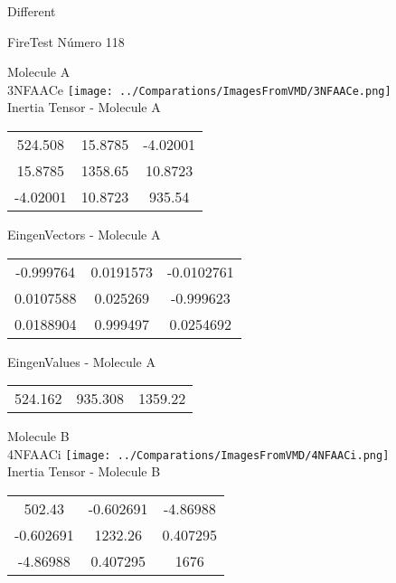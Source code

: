\begin{center}
\vtab
\vtab
\textcolor{NavyBlue}{\Large Different}
\end{center}

 \newpage

\vtab[-2cm]
\begin{center}
{\large FireTest \tab Número 118}
\end{center}
\begin{multicols}{2}
\begin{center}

Molecule A \\ 
3NFAACe
\texttt{[image: ../Comparations/ImagesFromVMD/3NFAACe.png]}
\\
Inertia Tensor - Molecule A \\
\vtab

\begin{tabular}{|c c c|}
524.508	 & 	15.8785	 & 	-4.02001	 \\
15.8785	 & 	1358.65	 & 	10.8723	 \\
-4.02001	 & 	10.8723	 & 	935.54
\end{tabular}

\vtab
 EingenVectors - Molecule A     \\
\vtab
\begin{tabular}{|c c c|}
-0.999764	 & 	0.0191573	 & 	-0.0102761	 \\
0.0107588	 & 	0.025269	 & 	-0.999623	 \\
0.0188904	 & 	0.999497	 & 	0.0254692
\end{tabular}

\vtab
 EingenValues - Molecule A     \\
\vtab
\begin{tabular}{|c c c|}
524.162	 & 	935.308	 & 	1359.22	 \\
\end{tabular}
\columnbreak

Molecule B \\ 
4NFAACi
\texttt{[image: ../Comparations/ImagesFromVMD/4NFAACi.png]}
\\
Inertia Tensor - Molecule B \\
\vtab

\begin{tabular}{|c c c|}
502.43	 & 	-0.602691	 & 	-4.86988	 \\
-0.602691	 & 	1232.26	 & 	0.407295	 \\
-4.86988	 & 	0.407295	 & 	1676
\end{tabular}


\end{center}
\end{multicols}
